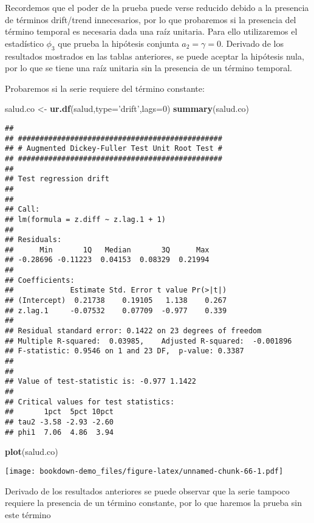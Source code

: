 \documentclass[]{book}
\newenvironment{Shaded}{\begin{snugshade}}{\end{snugshade}}
\newcommand{\KeywordTok}[1]{\textcolor[rgb]{0.13,0.29,0.53}{\textbf{#1}}}
\newcommand{\DataTypeTok}[1]{\textcolor[rgb]{0.13,0.29,0.53}{#1}}
\newcommand{\DecValTok}[1]{\textcolor[rgb]{0.00,0.00,0.81}{#1}}
\newcommand{\StringTok}[1]{\textcolor[rgb]{0.31,0.60,0.02}{#1}}
\newcommand{\NormalTok}[1]{#1}
\theoremstyle{definition}
\theoremstyle{definition}
\theoremstyle{definition}
\theoremstyle{remark}
\begin{document}
Recordemos que el poder de la prueba puede verse reducido debido a la
presencia de términos drift/trend innecesarios, por lo que probaremos si
la presencia del término temporal es necesaria dada una raíz unitaria.
Para ello utilizaremos el estadístico \(\phi_3\) que prueba la hipótesis
conjunta \(a_2=\gamma=0\). Derivado de los resultados mostrados en las
tablas anteriores, se puede aceptar la hipótesis nula, por lo que se
tiene una raíz unitaria sin la presencia de un término temporal.

Probaremos si la serie requiere del término constante:

\begin{Shaded}
\begin{Highlighting}[]
\NormalTok{salud.co <-}\StringTok{ }\KeywordTok{ur.df}\NormalTok{(salud,}\DataTypeTok{type=}\StringTok{'drift'}\NormalTok{,}\DataTypeTok{lags=}\DecValTok{0}\NormalTok{)}
\KeywordTok{summary}\NormalTok{(salud.co)}
\end{Highlighting}
\end{Shaded}

\begin{verbatim}
## 
## ############################################### 
## # Augmented Dickey-Fuller Test Unit Root Test # 
## ############################################### 
## 
## Test regression drift 
## 
## 
## Call:
## lm(formula = z.diff ~ z.lag.1 + 1)
## 
## Residuals:
##      Min       1Q   Median       3Q      Max 
## -0.28696 -0.11223  0.04153  0.08329  0.21994 
## 
## Coefficients:
##             Estimate Std. Error t value Pr(>|t|)
## (Intercept)  0.21738    0.19105   1.138    0.267
## z.lag.1     -0.07532    0.07709  -0.977    0.339
## 
## Residual standard error: 0.1422 on 23 degrees of freedom
## Multiple R-squared:  0.03985,    Adjusted R-squared:  -0.001896 
## F-statistic: 0.9546 on 1 and 23 DF,  p-value: 0.3387
## 
## 
## Value of test-statistic is: -0.977 1.1422 
## 
## Critical values for test statistics: 
##       1pct  5pct 10pct
## tau2 -3.58 -2.93 -2.60
## phi1  7.06  4.86  3.94
\end{verbatim}

\begin{Shaded}
\begin{Highlighting}[]
\KeywordTok{plot}\NormalTok{(salud.co)}
\end{Highlighting}
\end{Shaded}

\texttt{[image: bookdown-demo\_files/figure-latex/unnamed-chunk-66-1.pdf]}

Derivado de los resultados anteriores se puede observar que la serie
tampoco requiere la presencia de un término constante, por lo que
haremos la prueba sin este término
\end{document}
